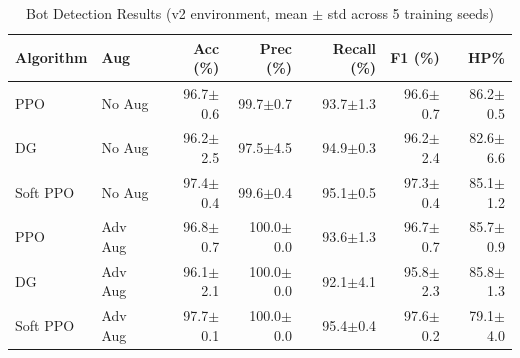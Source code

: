 \begin{table}[h]
\centering
\caption{Bot Detection Results (v2 environment, mean $\pm$ std across 5 training seeds)}
\label{tab:main_results}
\begin{tabular}{llrrrrr}
\toprule
Algorithm & Aug & Acc (\%) & Prec (\%) & Recall (\%) & F1 (\%) & HP\% \\
\midrule
  PPO & No Aug & 96.7$\pm$0.6 & 99.7$\pm$0.7 & 93.7$\pm$1.3 & 96.6$\pm$0.7 & 86.2$\pm$0.5 \\
  DG & No Aug & 96.2$\pm$2.5 & 97.5$\pm$4.5 & 94.9$\pm$0.3 & 96.2$\pm$2.4 & 82.6$\pm$6.6 \\
  Soft PPO & No Aug & 97.4$\pm$0.4 & 99.6$\pm$0.4 & 95.1$\pm$0.5 & 97.3$\pm$0.4 & 85.1$\pm$1.2 \\
\midrule
  PPO & Adv Aug & 96.8$\pm$0.7 & 100.0$\pm$0.0 & 93.6$\pm$1.3 & 96.7$\pm$0.7 & 85.7$\pm$0.9 \\
  DG & Adv Aug & 96.1$\pm$2.1 & 100.0$\pm$0.0 & 92.1$\pm$4.1 & 95.8$\pm$2.3 & 85.8$\pm$1.3 \\
  Soft PPO & Adv Aug & 97.7$\pm$0.1 & 100.0$\pm$0.0 & 95.4$\pm$0.4 & 97.6$\pm$0.2 & 79.1$\pm$4.0 \\
\midrule
\bottomrule
\end{tabular}
\end{table}
